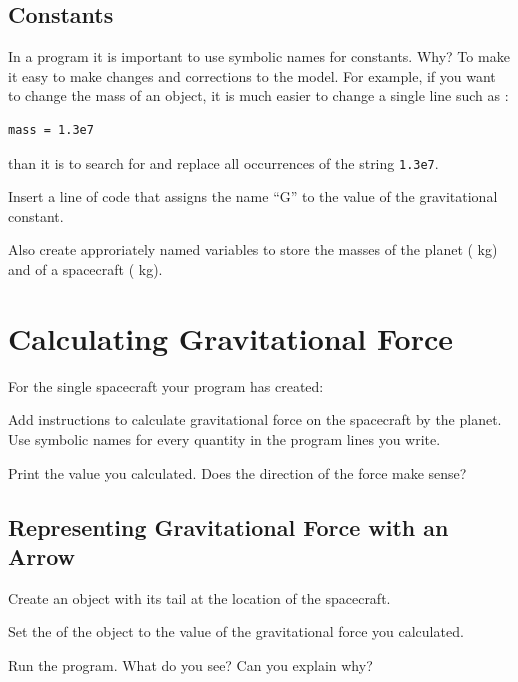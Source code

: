 \documentclass[10pt]{article}
\begin{document}
\subsection{Constants}

In a program it is important to use symbolic names for constants.  Why?  To make it easy to make changes and corrections to the model.  For example, if you want to change the mass of an object, it is much easier to change a single line such as :

\color{CodeColor}
\begin{verbatim}
mass = 1.3e7
\end{verbatim}
\color{black}

than it is to search for and replace all occurrences of the string \color{CodeColor}\texttt{1.3e7}\color{black}.\\

\begin{compactitem}[\color{MIRed}$\Rightarrow$]
\item Insert a line of code that assigns the name ``G'' to the value of the gravitational constant.
\item Also create approriately named variables to store the masses of the planet ( kg) and of a spacecraft ( kg).\\
\end{compactitem}

\section{Calculating Gravitational Force}

For the single spacecraft your program has created:\\
\begin{compactitem}[\color{MIRed}$\Rightarrow$]
\item Add instructions to calculate gravitational force on the spacecraft by the planet. Use symbolic names for every quantity in the program lines you write.
\item Print the value you calculated.  Does the direction of the force make sense?
\end{compactitem}

\subsection{Representing Gravitational Force with an Arrow}  

\begin{compactitem}[\color{MIRed}$\Rightarrow$]
\item Create an  object with its tail at the location of the spacecraft.  
\item Set the  of the  object to the value of the gravitational force you calculated.
\item Run the program.  What do you see?  Can you explain why?
\end{compactitem}
\end{document}
